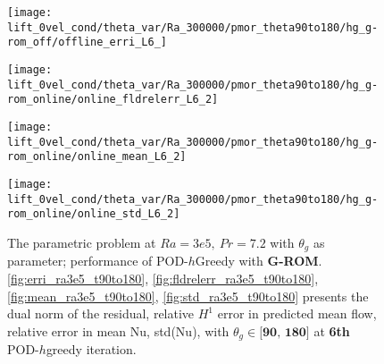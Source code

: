 \begin{figure}[h!]
    \begin{minipage}[b]{.25\linewidth}
        \centering \texttt{[image: lift\_0vel\_cond/theta\_var/Ra\_300000/pmor\_theta90to180/hg\_g-rom\_off/offline\_erri\_L6\_]}
        \label{fig:erri_ra3e5_t90to180}
    \end{minipage}%
    \begin{minipage}[b]{.25\linewidth}
        \centering \texttt{[image: lift\_0vel\_cond/theta\_var/Ra\_300000/pmor\_theta90to180/hg\_g-rom\_online/online\_fldrelerr\_L6\_2]}
        \label{fig:fldrelerr_ra3e5_t90to180}
    \end{minipage}
    \begin{minipage}[b]{.25\linewidth}
        \centering \texttt{[image: lift\_0vel\_cond/theta\_var/Ra\_300000/pmor\_theta90to180/hg\_g-rom\_online/online\_mean\_L6\_2]}
        \label{fig:mean_ra3e5_t90to180}
    \end{minipage}%
    \begin{minipage}[b]{.25\linewidth}
        \centering \texttt{[image: lift\_0vel\_cond/theta\_var/Ra\_300000/pmor\_theta90to180/hg\_g-rom\_online/online\_std\_L6\_2]}
        \label{fig:std_ra3e5_t90to180}
    \end{minipage} 
    \caption{The parametric problem at $Ra=3e5,~Pr=7.2$ with $\theta_g$ as
    parameter; performance of POD-$h$Greedy with \textbf{G-ROM}.  \ref{fig:erri_ra3e5_t90to180},
    \ref{fig:fldrelerr_ra3e5_t90to180}, \ref{fig:mean_ra3e5_t90to180}, \ref{fig:std_ra3e5_t90to180}
    presents the dual norm of the residual, relative $H^1$ error in predicted
    mean flow, relative error in mean Nu, std(Nu), with $\theta_g \in
    \textbf{[90,~180]}$ at \textbf{6th} POD-$h$greedy iteration.}
    \label{fig:online_ra3e5_t90to180} 
\end{figure}

